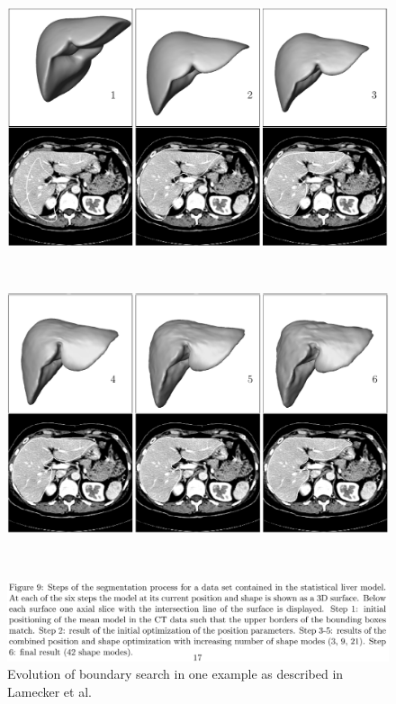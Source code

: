 \documentclass[]{article}
\begin{document}
	\begin{figure}[ht!]
		\centering
		\begin{minipage}{0.7\linewidth}
			\includegraphics[width=\linewidth]{images/image5}
		\end{minipage}\\
		\begin{minipage}{0.7\linewidth}
			\includegraphics[width=\linewidth]{images/image13}
		\end{minipage}\\
		\begin{minipage}{0.7\linewidth}
			\includegraphics[width=\linewidth]{images/image18}
		\end{minipage}
		\caption{Evolution of boundary search in one example as described in Lamecker et al. \cite{Lamecker2004}}
		\label{Lamecker2004_Fig9}
	\end{figure}
	
\end{document}
